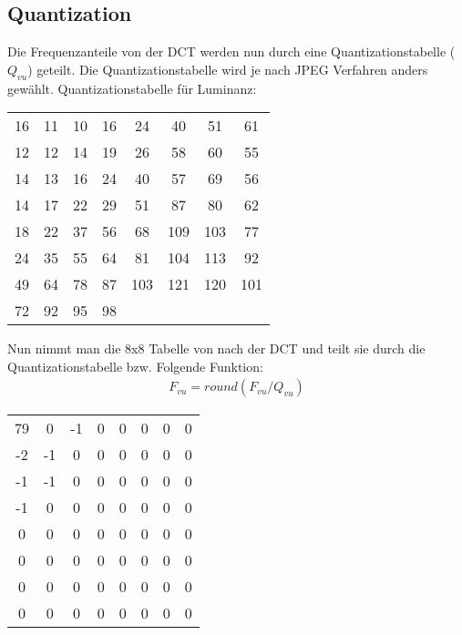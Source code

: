 \subsection{Quantization}
Die Frequenzanteile von der DCT werden nun durch eine Quantizationstabelle ($Q_{vu}$) geteilt. Die Quantizationstabelle
wird je nach JPEG Verfahren anders gewählt. Quantizationstabelle für Luminanz:
\begin{center}
    \begin{tabular}{ c c c c c c c c }
        16 & 11 & 10 & 16 & 24 & 40 & 51 & 61 \\
        12 & 12 & 14 & 19 & 26 & 58 & 60 & 55 \\
        14 & 13 & 16 & 24 & 40 & 57 & 69 & 56 \\
        14 & 17 & 22 & 29 & 51 & 87 & 80 & 62 \\
        18 & 22 & 37 & 56 & 68 & 109 & 103 & 77 \\
        24 & 35 & 55 & 64 & 81 & 104 & 113 & 92 \\
        49 & 64 & 78 & 87 & 103 & 121 & 120 & 101 \\
        72 & 92 & 95 & 98 & 
    \end{tabular}
\end{center}
Nun nimmt man die 8x8 Tabelle von nach der DCT und teilt sie durch die Quantizationstabelle bzw.
Folgende Funktion:
\begin{align*}
    F_{vu} = round(F_{vu}/Q_{vu})
\end{align*}

\begin{center}
    \begin{tabular}{ c c c c c c c c }
        79 & 0 & -1 & 0 & 0 & 0 & 0 & 0 \\
        -2 & -1 & 0 & 0 & 0 & 0 & 0 & 0 \\
        -1 & -1 & 0 & 0 & 0 & 0 & 0 & 0 \\
        -1 & 0 & 0 & 0 & 0 & 0 & 0 & 0 \\
        0 & 0 & 0 & 0 & 0 & 0 & 0 & 0 \\
        0 & 0 & 0 & 0 & 0 & 0 & 0 & 0 \\
        0 & 0 & 0 & 0 & 0 & 0 & 0 & 0 \\
        0 & 0 & 0 & 0 & 0 & 0 & 0 & 0
    \end{tabular}
\end{center}


